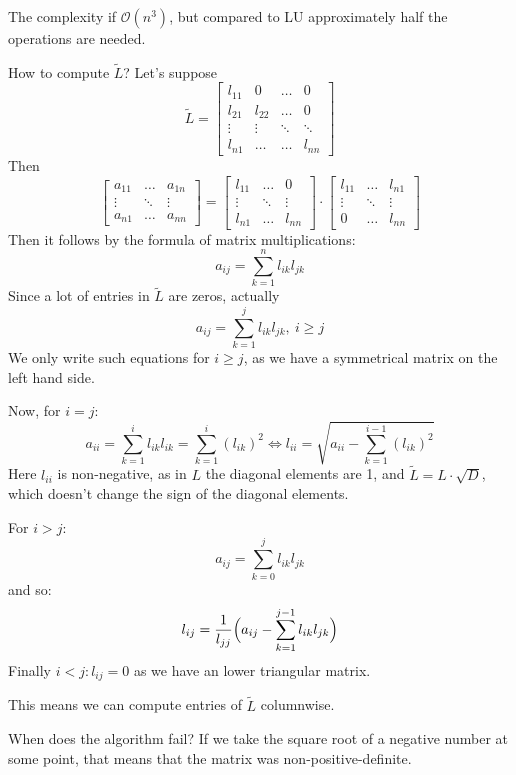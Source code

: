 The complexity if $\mathcal{O}(n^3)$, but compared to LU approximately half the operations
are needed.

How to compute $\widetilde{L}$? Let's suppose
\[
    \tilde{L} = \begin{bmatrix}
        l_{11} & 0 & \dots & 0\\
        l_{21}  & l_{22} & \dots & 0\\
        \vdots & \vdots & \ddots & \ddots\\
        l_{n1} & \dots & \dots & l_{nn}
    \end{bmatrix}
\] 
Then
\[
    \begin{bmatrix}
        a_{11} & \dots & a_{1n}\\
        \vdots & \ddots & \vdots\\
        a_{n1} & \dots & a_{nn}
    \end{bmatrix} =
    \begin{bmatrix}
        l_{11} & \dots & 0\\
        \vdots & \ddots & \vdots\\
        l_{n1} & \dots & l_{nn}
    \end{bmatrix} \cdot
    \begin{bmatrix}
        l_{11} & \dots & l_{n1}\\
        \vdots & \ddots & \vdots\\
        0 & \dots & l_{nn}
    \end{bmatrix}
\]
Then it follows by the formula of matrix multiplications:
\[ a_{ij} = \sum_{k=1}^n l_{ik} l_{jk} \]
Since a lot of entries in $\tilde{L}$ are zeros, actually
\[ a_{ij} = \sum_{k = 1}^j l_{ik} l_{jk},\ i \ge j \]
We only write such equations for $i \ge j$, as we have a symmetrical matrix
on the left hand side.

Now, for $i = j$:
\[
    a_{ii} = \sum_{k=1}^{i} l_{ik} l_{ik} = \sum_{k=1}^i (l_{ik})^2
    \Longleftrightarrow l_{ii} = \sqrt{a_{ii} - \sum_{k=1}^{i-1} (l_{ik})^2}
\]
Here $l_{ii}$ is non-negative, as in $L$ the diagonal elements are 1,
and $\tilde{L} = L \cdot \sqrt{D}$, which doesn't change the sign of the diagonal elements.

For $i > j$: \[ a_{ij} = \sum_{k=0}^j l_{ik} l_{jk} \]
and so:
\[ l_{ij} = \frac{1}{l_{jj}} \Bigl(a_{ij} - \sum_{k=1}^{j-1} l_{ik} l_{jk}\Bigr) \]
Finally $i < j: l_{ij} = 0$ as we have an lower triangular matrix.

This means we can compute entries of $\tilde{L}$ columnwise.

When does the algorithm fail? If we take the square root of a negative number
at some point, that means that the matrix was non-positive-definite.

